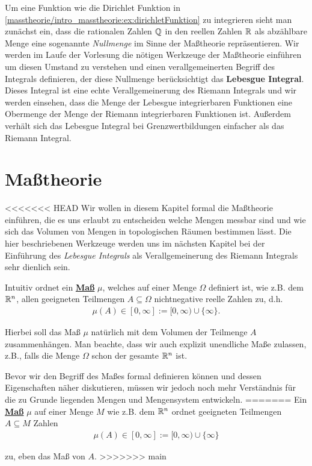 \par
Um eine Funktion wie die Dirichlet Funktion in \cref{masstheorie/intro_masstheorie:ex:dirichletFunktion} zu integrieren sieht man zunächst ein, dass die rationalen Zahlen \(\mathbb{Q}\) in den reellen Zahlen \(\mathbb{R}\) als abzählbare Menge eine sogenannte \emph{Nullmenge} im Sinne der Maßtheorie repräsentieren.
Wir werden im Laufe der Vorlesung die nötigen Werkzeuge der Maßtheorie einführen um diesen Umstand zu verstehen und einen verallgemeinerten Begriff des Integrals definieren, der diese Nullmenge berücksichtigt   das \textbf{Lebesgue Integral}.
Dieses Integral ist eine echte Verallgemeinerung des Riemann Integrals und wir werden einsehen, dass die Menge der Lebesgue integrierbaren Funktionen eine Obermenge der Menge der Riemann integrierbaren Funktionen ist.
Außerdem verhält sich das Lebesgue Integral bei Grenzwertbildungen einfacher als das Riemann Integral.


\section{Maßtheorie}
\label{\detokenize{masstheorie/masstheorie:masztheorie}}\label{\detokenize{masstheorie/masstheorie::doc}}
\par
<<<<<<< HEAD
Wir wollen in diesem Kapitel formal die Maßtheorie einführen, die es uns erlaubt zu entscheiden welche Mengen messbar sind und wie sich das Volumen von Mengen in topologischen Räumen bestimmen lässt.
Die hier beschriebenen Werkzeuge werden uns im nächsten Kapitel bei der Einführung des \emph{Lebesgue Integrals} als Verallgemeinerung des Riemann Integrals sehr dienlich sein.

\par
Intuitiv ordnet ein \href{https://de.wikipedia.org/wiki/Ma\%c3\%9f\_(Mathematik)}{\textbf{Maß}} \(\mu\), welches auf einer Menge \(\Omega\) definiert ist, wie z.B. dem \(\mathbb{R}^n\), allen geeigneten Teilmengen \(A\subseteq \Omega\) nichtnegative reelle Zahlen zu, d.h.
\begin{align*}
\mu(A)\in[0,\infty] := [0,\infty)\cup\{\infty\}.
\end{align*}
\par
Hierbei soll das Maß \(\mu\) natürlich mit dem Volumen der Teilmenge \(A\) zusammenhängen.
Man beachte, dass wir auch explizit unendliche Maße zulassen, z.B., falls die Menge \(\Omega\) schon der gesamte \(\mathbb{R}^n\) ist.

\par
Bevor wir den Begriff des Maßes formal definieren können und dessen Eigenschaften näher diskutieren, müssen wir jedoch noch mehr Verständnis für die zu Grunde liegenden Mengen und Mengensystem entwickeln.
=======
Ein \href{https://de.wikipedia.org/wiki/Ma\%c3\%9f\_(Mathematik)}{\textbf{Maß}} \(\mu\) auf einer Menge \(M\) wie z.B. dem \(\mathbb{R}^n\)
ordnet geeigneten Teilmengen \(A\subseteq M\)
Zahlen
\begin{align*}
\mu(A)\in[0,\infty]:=[0,\infty)\cup\{\infty\}
\end{align*}
\par
zu, eben das Maß von \(A\).
>>>>>>> main


